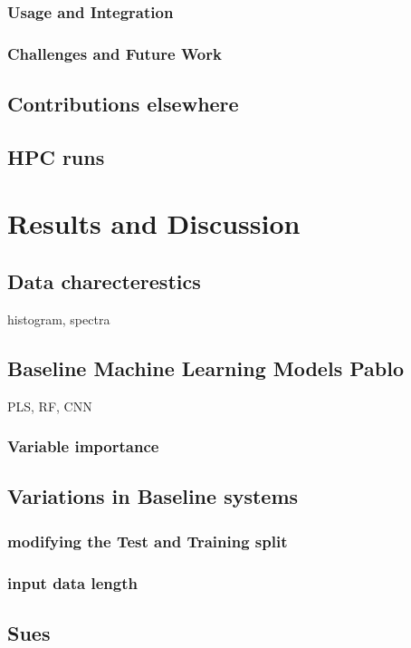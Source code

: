 \documentclass[12pt,a4paper]{report}
\begin{document}
\subsection{Usage and Integration}
\subsection{Challenges and Future Work}



\section{Contributions elsewhere}
\section{HPC runs}


\chapter{Results and Discussion}

\section{Data charecterestics}
histogram, spectra
\section{Baseline Machine Learning Models Pablo}
PLS, RF, CNN

\subsection{Variable importance}

\section{ Variations in Baseline systems}
\subsection{ modifying the Test and Training split}
\subsection{ input data length}

\section{Sues}
\end{document}
